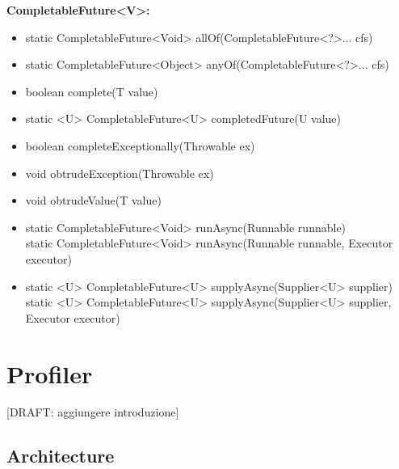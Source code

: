 \documentclass[]{usiinfthesis}
\begin{document}
{\noindent
\textbf{CompletableFuture<V>:}
\begin{itemize}
    \item   static CompletableFuture<Void> allOf(CompletableFuture<?>... cfs)
    \item   static CompletableFuture<Object> anyOf(CompletableFuture<?>... cfs)
    \item   boolean complete(T value)
    \item   static <U> CompletableFuture<U> completedFuture(U value)
    \item   boolean completeExceptionally(Throwable ex)
    \item   void obtrudeException(Throwable ex)
    \item   void obtrudeValue(T value)
    \item   static CompletableFuture<Void> runAsync(Runnable runnable)
    \mbox{}\\ static CompletableFuture<Void> runAsync(Runnable runnable, Executor executor)
    \item   static <U> CompletableFuture<U> supplyAsync(Supplier<U> supplier)
    \mbox{}\\ static <U> CompletableFuture<U> supplyAsync(Supplier<U> supplier, Executor executor)
\end{itemize}
}

\chapter{Profiler}
\large
[DRAFT: aggiungere introduzione]

\section{Architecture}
\end{document}
